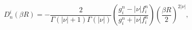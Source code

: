 \begin{equation}
D^i_n(\beta R)=-\frac{2}{\Gamma(|\nu|+1)\Gamma(|\nu|)}\left(\frac{g^n_i
-|\nu|f^{n}_{i}}{g^{n}_{i}+|\nu|f^{n}_{i}}\right)\left( \frac{\beta R}{2}
\right)^{2|\nu|},
\label{27}
\end{equation} 
